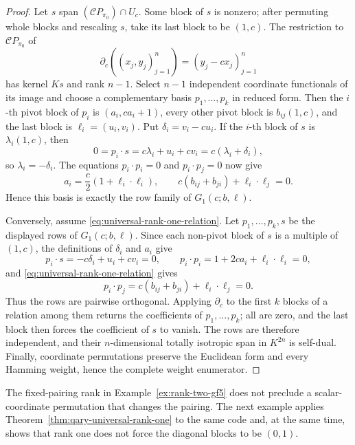 \documentclass[12pt]{article}
\begin{document}
\begin{proof}
Let \(s\) span \((\mathcal C P_{\pi_0})\cap U_c\).  Some block of \(s\) is nonzero;
after permuting whole blocks and rescaling \(s\), take its last block to be
\((1,c)\).  The restriction to \(\mathcal C P_{\pi_0}\) of
\[
\partial_c((x_j,y_j)_{j=1}^n)=(y_j-cx_j)_{j=1}^n
\]
has kernel \(Ks\) and rank \(n-1\).  Select \(n-1\) independent coordinate
functionals of its image and choose a complementary basis
\(p_1,\ldots,p_k\) in reduced form.  Then the \(i\)-th pivot block of
\(p_i\) is \((a_i,ca_i+1)\), every other pivot block is
\(b_{ij}(1,c)\), and the last block is \(\ell_i=(u_i,v_i)\).  Put
\(\delta_i=v_i-cu_i\).  If the \(i\)-th block of \(s\) is
\(\lambda_i(1,c)\), then
\[
0=p_i\cdot s=c\lambda_i+u_i+cv_i
=c(\lambda_i+\delta_i),
\]
so \(\lambda_i=-\delta_i\).  The equations \(p_i\cdot p_i=0\) and
\(p_i\cdot p_j=0\) now give
\[
a_i=\frac c2(1+\ell_i\cdot\ell_i),
\qquad
c(b_{ij}+b_{ji})+\ell_i\cdot\ell_j=0.
\]
Hence this basis is exactly the row family of \(G_1(c;b,\ell)\).

Conversely, assume \eqref{eq:universal-rank-one-relation}.  Let
\(p_1,\ldots,p_k,s\) be the displayed rows of \(G_1(c;b,\ell)\).  Since
each non-pivot block of \(s\) is a multiple of \((1,c)\), the definitions of
\(\delta_i\) and \(a_i\) give
\[
p_i\cdot s=-c\delta_i+u_i+cv_i=0,
\qquad
p_i\cdot p_i=1+2ca_i+\ell_i\cdot\ell_i=0,
\]
and \eqref{eq:universal-rank-one-relation} gives
\[
p_i\cdot p_j=c(b_{ij}+b_{ji})+\ell_i\cdot\ell_j=0.
\]
Thus the rows are pairwise orthogonal.  Applying \(\partial_c\) to the
first \(k\) blocks of a relation among them returns the coefficients of
\(p_1,\ldots,p_k\); all are zero, and the last block then forces the
coefficient of \(s\) to vanish.  The rows are therefore independent, and
their \(n\)-dimensional totally isotropic span in \(K^{2n}\) is self-dual.
Finally, coordinate permutations preserve the Euclidean form and every
Hamming weight, hence the complete weight enumerator.
\end{proof}

The fixed-pairing rank in Example~\ref{ex:rank-two-gf5} does not preclude a
scalar-coordinate permutation that changes the pairing. The next example
applies Theorem~\ref{thm:qary-universal-rank-one} to the same code and, at
the same time, shows that rank one does not force the diagonal blocks to be
\((0,1)\).
\end{document}
